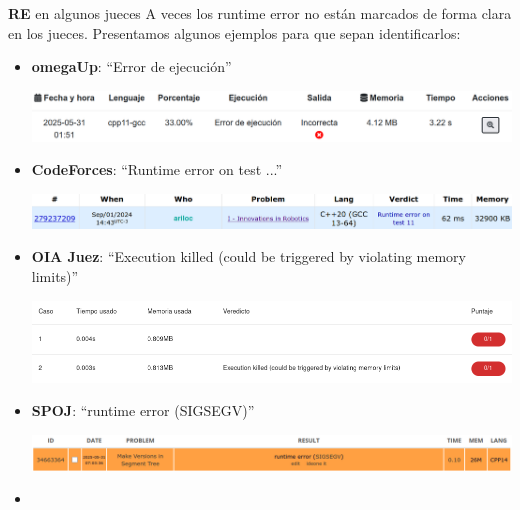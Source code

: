 \documentclass{beamer}
\begin{document}
    \begin{frame}{\textbf{RE} en algunos jueces}
        A veces los runtime error no están marcados de forma clara en los jueces. Presentamos algunos ejemplos para que sepan identificarlos:\pause
        \setlength{\leftmargini}{16pt}
        \begin{itemize}
            \item \textbf{omegaUp}: ``Error de ejecución''
            \begin{center}
                \includegraphics[width=.8\linewidth]{./ou_rte.png}
            \end{center}

            \item \textbf{CodeForces}: ``Runtime error on test ...''
            \begin{center}
                \includegraphics[width=.8\linewidth]{./cf_rte.png}
            \end{center}
            
            \item \textbf{OIA Juez}: ``Execution killed (could be triggered by violating memory limits)''
            \begin{center}
                \includegraphics[width=.8\linewidth]{./oiaj_rte.png}
            \end{center}

            \item \textbf{SPOJ}: ``runtime error (SIGSEGV)''
            \begin{center}
                \includegraphics[width=.8\linewidth]{./spoj_rte.png}
            \end{center}
        \item 
        \end{itemize}
    \end{frame}
\end{document}
